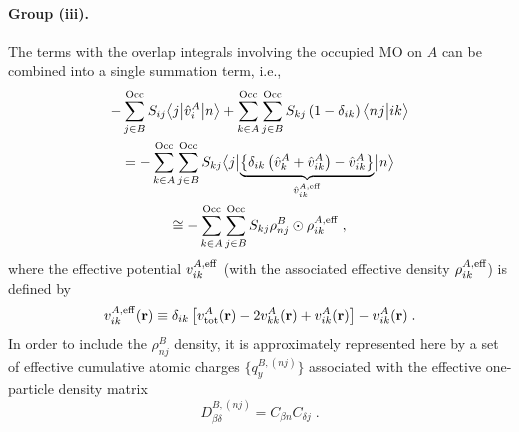 \documentclass[aip,jcp,amsmath,amssymb,reprint,floatfix]{revtex4-1}
\begin{document}
\paragraph{Group (iii).}
The terms with the overlap integrals involving the occupied MO on $A$
can be combined into a single summation term, i.e.,
\begin{multline} \label{e:ct.group-iii}
       - \sum_{j\in B}^{\rm Occ} S_{ij} \tBraKet{j}{\hat{v}^A_{i} }{n}  
     + \sum_{k\in A}^{\rm Occ} \sum_{j\in B}^{\rm Occ}  
        S_{kj} \left( 1 - \delta_{ik} \right)
        \BraKet{nj}{ik} \\ = -
 \sum_{k\in A}^{\rm Occ} 
 \sum_{j\in B}^{\rm Occ}
 S_{kj} 
 \tBraKet{j}{
 \underbrace{
 \left\{ 
  \delta_{ik} \left( \hat{v}^A_{k} + \hat{v}^A_{ik} \right)   - \hat{v}^A_{ik}
 \right\} 
  }_{\hat{v}^{A,{\rm eff}}_{ik}}
 }{n}  \\ \cong -
%
  \sum_{k\in A}^{\rm Occ} 
 \sum_{j\in B}^{\rm Occ}
 S_{kj} 
 \rho_{nj}^B \odot \rho^{A,{\rm eff}}_{ik} \;,
\end{multline}
%
where the effective potential ${v}^{A,{\rm eff}}_{ik}$ (with the associated 
effective density $\rho^{A,{\rm eff}}_{ik}$) 
is defined by
%
\begin{equation} \label{e:ct.group-iii.oep}
 {v}^{A,{\rm eff}}_{ik}({\bf r}) \equiv
 \delta_{ik} 
 \left[
  v^A_{\rm tot} ({\bf r}) - 2 v^A_{kk} ({\bf r}) + v^A_{ik} ({\bf r})
 \right] 
  - v^A_{ik} ({\bf r}) \;.
\end{equation}
%
In order to include the $\rho^{B}_{nj}$ density, it is approximately represented here by a set of effective 
cumulative
atomic charges $\{ q^{B,(nj)}_{y} \}$ associated with the effective one\hyp{}particle density matrix
%
\begin{equation} \label{e:oed-group-iii}
 D^{B,(nj)}_{\beta\delta} = C_{\beta n} C_{\delta j} \;.
\end{equation}
\end{document}
